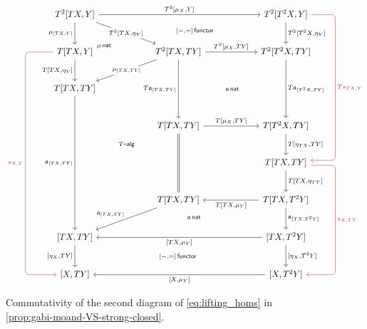 \documentclass[12pt,dvipsnames,oneside]{amsart}
\theoremstyle{plain}
\theoremstyle{remark}
\theoremstyle{definition}
\newcommand{\act}{\mathfrak{a}}
\begin{document}
\begin{figure}[htbp]
  \[
    \begin{tikzcd}[column sep=60pt, row sep=25pt]
      {T^2[TX,Y]} & & {T^2[T^2X,Y]} \\
      {T[TX,Y]} & {T^2[TX,TY]} & {T^2[T^2X,TY]} \\
      {T[TX,TY]} & & \\
      & {T[TX,TY]} & {T[T^2X,TY]} \\
      & & {T[TX,TY]} \\
      & {T[TX,TY]} & {T[TX,T^2Y]} \\
      {[TX,TY]} & & {[TX,T^2Y]} \\
      {[X,TY]} & & {[X,T^2Y]}
      \arrow["{\mu_{[TX,Y]}}"', from=1-1, to=2-1]
      \arrow["{T^2[\mu_X,Y]}", from=1-1, to=1-3]
      \arrow["{T^2[TX,\eta_Y]}"{description}, from=1-1, to=2-2]
      \arrow["{T^2[T^2X,\eta_Y]}", from=1-3, to=2-3]
      \arrow["{[-,=]\,\mathsf{functor}}"{description, pos=0.4}, draw=none, from=1-3, to=2-1]
      \arrow["{T[TX,\eta_Y]}"', from=2-1, to=3-1]
      \arrow["{T^2[\mu_X,TY]}", from=2-2, to=2-3]
      \arrow["{T\act_{[TX,TY]}}"', from=2-2, to=4-2]
      \arrow[""{name=0, anchor=center, inner sep=0}, "{\mu_{[TX,TY]}}"{description}, from=2-2, to=3-1]
      \arrow["{\mu\,\mathsf{nat}}"{description}, draw=none, from=1-1, to=0]
      \arrow["{T\act_{[T^2X,TY]}}", from=2-3, to=4-3]
      \arrow["{\act\,\mathsf{nat}}"{description}, draw=none, from=2-3, to=4-2]
      \arrow["{T\mbox{-}\mathsf{alg}}"{description}, draw=none, from=3-1, to=6-2]
      \arrow["{\act_{[TX,TY]}}"', from=3-1, to=7-1]
      \arrow["{T[\mu_X,TY]}", from=4-2, to=4-3]
      \arrow[equals, from=4-2, to=6-2]
      \arrow["{T[\eta_{TX},TY]}", from=4-3, to=5-3]
      \arrow["{T[TX,\eta_{TY}]}", from=5-3, to=6-3]
      \arrow[""{name=1, anchor=center, inner sep=0}, "{\act_{[TX,TY]}}"', from=6-2, to=7-1]
      \arrow["{\act_{[TX,T^2Y]}}", from=6-3, to=7-3]
      \arrow["{T[TX,\mu_Y]}", from=6-3, to=6-2]
      \arrow["{\act\,\mathsf{nat}}"{description}, shift left=3, draw=none, from=6-3, to=1]
      \arrow["{[\eta_X,TY]}"', from=7-1, to=8-1]
      \arrow["{[\eta_X,T^2Y]}", from=7-3, to=8-3]
      \arrow["{[TX,\mu_Y]}", from=7-3, to=7-1]
      \arrow["{[-,=]\,\mathsf{functor}}"{description}, draw=none, from=7-3, to=8-1]
      \arrow["{[X,\mu_Y]}", from=8-3, to=8-1]
      \arrow["{Ts_{TX,Y}}", from=1-3, to=5-3, rounded corners, color=red,
      to path={-- ([xshift=2cm]\tikztostart.center) -- ([xshift=2cm,yshift=.1cm]\tikztotarget.center) \tikztonodes -- ([yshift=.1cm]\tikztotarget.east)}]
      \arrow["{s_{X,TY}}", from=5-3, to=8-3, rounded corners, color=red,
      to path={([yshift=-.1cm]\tikztostart.east) -- ([xshift=2cm,yshift=-.1cm]\tikztostart.center) -- ([xshift=2cm]\tikztotarget.center) \tikztonodes -- (\tikztotarget.east)}]
      \arrow["{s_{X,Y}}"', from=2-1, to=8-1, rounded corners, color=red,
      to path={-- ([xshift=-2cm]\tikztostart.center) -- ([xshift=-2cm]\tikztotarget.center) \tikztonodes -- (\tikztotarget.west)}]
    \end{tikzcd}
  \]
  \caption{Commutativity of the second diagram of \eqref{eq:lifting_homs} in \cref{prop:gabi-moand-VS-strong-closed}.}
  \label{fig:gabi-moand-VS-strong-closed-1}
\end{figure}
\end{document}

